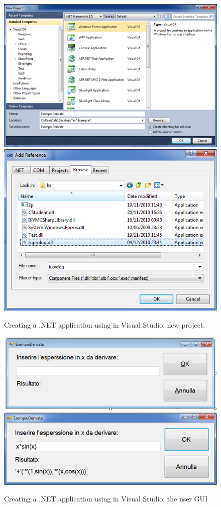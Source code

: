 \begin{figure}
\centering
  \includegraphics[width=12cm]{images/dotnet-visualstudio1}\\
  \includegraphics[width=12cm]{images/dotnet-visualstudio2}
  \caption{Creating a .NET application using \tuprolog{} in Visual Studio: new project.}\label{fig:dotnet-visualstudio1}
\end{figure}

\begin{figure}
\centering
  \includegraphics[width=12cm]{images/dotnet-visualstudio3}\\
  \includegraphics[width=12cm]{images/dotnet-visualstudio5}
  \caption{Creating a .NET application using \tuprolog{} in Visual Studio: the user GUI}\label{fig:dotnet-visualstudio3}
\end{figure}

